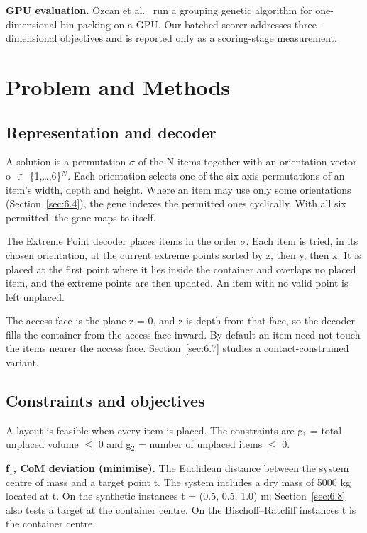\documentclass[journal]{IEEEtran}
\begin{document}
\textbf{GPU evaluation.} Özcan et al.~\cite{ozcan2016} run a grouping genetic algorithm for one-dimensional bin packing on a GPU. Our batched scorer addresses three-dimensional objectives and is reported only as a scoring-stage measurement.

\section{Problem and Methods}\label{sec:3}

\subsection{Representation and decoder}\label{sec:3.1}

A solution is a permutation \(\sigma\) of the N items together with an orientation vector o \(\in\) \{1,\ldots{},6\}\(^N\). Each orientation selects one of the six axis permutations of an item's width, depth and height. Where an item may use only some orientations (Section~\ref{sec:6.4}), the gene indexes the permitted ones cyclically. With all six permitted, the gene maps to itself.

The Extreme Point decoder places items in the order \(\sigma\). Each item is tried, in its chosen orientation, at the current extreme points sorted by z, then y, then x. It is placed at the first point where it lies inside the container and overlaps no placed item, and the extreme points are then updated. An item with no valid point is left unplaced.

The access face is the plane z = 0, and z is depth from that face, so the decoder fills the container from the access face inward. By default an item need not touch the items nearer the access face. Section~\ref{sec:6.7} studies a contact-constrained variant.

\subsection{Constraints and objectives}\label{sec:3.2}

A layout is feasible when every item is placed. The constraints are g\(_1\) = total unplaced volume \(\le\) 0 and g\(_2\) = number of unplaced items \(\le\) 0.

\textbf{f\(_1\), CoM deviation (minimise).} The Euclidean distance between the system centre of mass and a target point t. The system includes a dry mass of 5000 kg located at t. On the synthetic instances t = (0.5, 0.5, 1.0) m; Section~\ref{sec:6.8} also tests a target at the container centre. On the Bischoff--Ratcliff instances t is the container centre.
\end{document}
